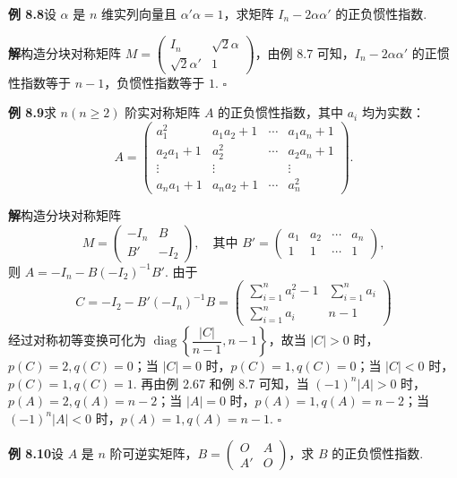 \documentclass[UTF8, 12pt, fontset=fandol, oneside]{ctexart}
\begin{document}
\noindent\textbf{例 8.8}\quad 设 $\alpha$ 是 $n$ 维实列向量且 $\alpha'\alpha=1$，求矩阵 $I_n-2\alpha\alpha'$ 的正负惯性指数.

\noindent\textbf{解}\quad 构造分块对称矩阵 $M=\left(\begin{array}{cc}I_n&\sqrt{2}\alpha\\ \sqrt{2}\alpha'&1\end{array}\right)$，由例 8.7 可知，$I_n-2\alpha\alpha'$ 的正惯性指数等于 $n-1$，负惯性指数等于 $1$. $\ensuremath{\square}$

\noindent\textbf{例 8.9}\quad 求 $n(n\ge 2)$ 阶实对称矩阵 $A$ 的正负惯性指数，其中 $a_i$ 均为实数：
\[
A=\left(\begin{array}{cccc}
a_1^2 & a_1a_2+1 & \cdots & a_1a_n+1\\
a_2a_1+1 & a_2^2 & \cdots & a_2a_n+1\\
\vdots & \vdots &        & \vdots\\
a_na_1+1 & a_na_2+1 & \cdots & a_n^2
\end{array}\right).
\]

\noindent\textbf{解}\quad 构造分块对称矩阵
\[
M=\left(\begin{array}{cc}
-I_n & B\\
B' & -I_2
\end{array}\right),\quad
\text{其中 }B'=\left(\begin{array}{cccc}
a_1 & a_2 & \cdots & a_n\\
1 & 1 & \cdots & 1
\end{array}\right),
\]
则 $A=-I_n-B(-I_2)^{-1}B'$. 由于
\[
C=-I_2-B'(-I_n)^{-1}B=
\left(\begin{array}{cc}
\sum_{i=1}^n a_i^2-1 & \sum_{i=1}^n a_i\\
\sum_{i=1}^n a_i & n-1
\end{array}\right)
\]
经过对称初等变换可化为 $\operatorname{diag}\left\{\dfrac{|C|}{n-1},n-1\right\}$，故当 $|C|>0$ 时，$p(C)=2,q(C)=0$；当 $|C|=0$ 时，$p(C)=1,q(C)=0$；当 $|C|<0$ 时，$p(C)=1,q(C)=1$. 再由例 2.67 和例 8.7 可知，当 $(-1)^n|A|>0$ 时，$p(A)=2,q(A)=n-2$；当 $|A|=0$ 时，$p(A)=1,q(A)=n-2$；当 $(-1)^n|A|<0$ 时，$p(A)=1,q(A)=n-1$. $\ensuremath{\square}$

\noindent\textbf{例 8.10}\quad 设 $A$ 是 $n$ 阶可逆实矩阵，$B=\left(\begin{array}{cc}O&A\\ A'&O\end{array}\right)$，求 $B$ 的正负惯性指数.
\end{document}

